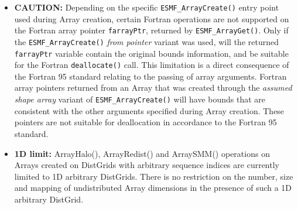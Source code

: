 
\begin{itemize}
\label{Array:rest}

\item {\bf CAUTION:} Depending on the specific {\tt ESMF\_ArrayCreate()} entry point used during Array creation, certain Fortran operations are not supported on the Fortran array pointer {\tt farrayPtr}, returned by {\tt ESMF\_ArrayGet()}. Only if the {\tt ESMF\_ArrayCreate()} {\em from pointer} variant was used, will the returned {\tt farrayPtr} variable contain the original bounds information, and be suitable for the Fortran {\tt deallocate()} call. This limitation is a direct consequence of the Fortran 95 standard relating to the passing of array arguments. Fortran array pointers returned from an Array that was created through the {\em assumed shape array} variant of {\tt ESMF\_ArrayCreate()} will have bounds that are consistent with the other arguments specified during Array creation. These pointers are not suitable for deallocation in accordance to the Fortran 95 standard.

\item {\bf 1D limit:} ArrayHalo(), ArrayRedist() and ArraySMM() operations on Arrays created on DistGrids with arbitrary sequence indices are currently limited to 1D arbitrary DistGrids. There is no restriction on the number, size
and mapping of undistributed Array dimensions in the presence of such a 1D
arbitrary DistGrid.

\end{itemize}

